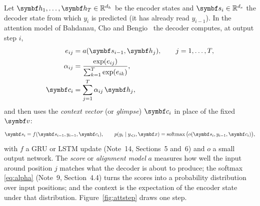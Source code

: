 \documentclass[11pt]{article}
\newcommand{\hv}{\vect{h}}
\newcommand{\sv}{\vect{s}}
\newcommand{\cv}{\vect{c}}
\newcommand{\vv}{\vect{v}}
\newcommand{\softmax}{\operatorname{softmax}}
\begin{document}
Let $\hv_1, \dots, \hv_T \in \R^{d_h}$ be the encoder states and $\sv_i \in \R^{d_s}$ the decoder state from which $y_i$
is predicted (it has already read $y_{i-1}$). In the attention model of Bahdanau, Cho and Bengio~\cite{bahdanau2015} the decoder computes, at output
step $i$,
\begin{align}
  e_{ij} &= a(\sv_{i-1}, \hv_j), \qquad j = 1, \dots, T, \label{eq:score}\\
  \alpha_{ij} &= \frac{\exp(e_{ij})}{\sum_{k=1}^{T}\exp(e_{ik})}, \label{eq:alpha}\\
  \cv_i &= \sum_{j=1}^{T}\alpha_{ij}\,\hv_j , \label{eq:context}
\end{align}
and then uses the \emph{context vector} (or \emph{glimpse}) $\cv_i$ in place of the fixed $\vv$:
\[
  \sv_i = f(\sv_{i-1}, y_{i-1}, \cv_i), \qquad p(y_i \mid y_{<i}, \x) = \softmax\big(o(\sv_i, y_{i-1}, \cv_i)\big),
\]
with $f$ a GRU or LSTM update (Note~14, Sections~5 and~6) and $o$ a small output network. The \emph{score} or \emph{alignment model}
$a$ measures how well the input around position $j$ matches what the decoder is about to produce; the softmax
\eqref{eq:alpha} (Note~9, Section~4.4) turns the scores into a probability distribution over input positions; and the
context is the expectation of the encoder state under that distribution. Figure~\ref{fig:attstep} draws one step.
\end{document}
